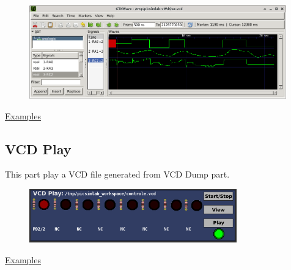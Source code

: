 \begin{figure}[H]
\center
\includegraphics[width=0.99\textwidth]{img/part_vcd_dump_gtkwave_an.png} 
\end{figure}

\href{https://lcgamboa.github.io/picsimlab_examples/parts_VCD_Dump_(Analogic).html}{Examples}

 
\subsection{VCD Play}


This part play a VCD file generated from VCD Dump part.  

\begin{figure}[H]
\center
\includegraphics[width=0.8\textwidth]{img/part_vcd_play.png} 
\end{figure}


\href{https://lcgamboa.github.io/picsimlab_examples/parts_VCD_Play.html}{Examples}

